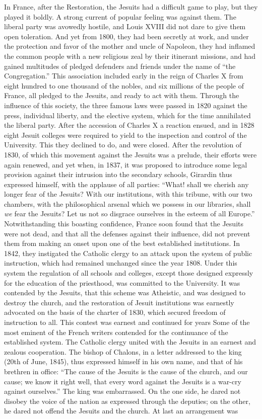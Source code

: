 \documentclass[]{book}
\begin{document}
In France, after the Restoration, the Jesuits had a difficult game to play, but they played it boldly. A strong current of popular feeling was against them. The liberal party was avowedly hostile, and Louis XVIII did not dare to give them open toleration. And yet from 1800, they had been secretly at work, and under the protection and favor of the mother and uncle of Napoleon, they had inflamed the common people with a new religious zeal by their itinerant missions, and had gained multitudes of pledged defenders and friends under the name of ``the Congregation.'' This association included early in the reign of Charles X from eight hundred to one thousand of the nobles, and six millions of the people of France, all pledged to the Jesuits, and ready to act with them. Through the influence of this society, the three famous laws were passed in 1820 against the press, individual liberty, and the elective system, which for the time annihilated the liberal party. After the accession of Charles X a reaction ensued, and in 1828 eight Jesuit colleges were required to yield to the inspection and control of the University. This they declined to do, and were closed. After the revolution of 1830, of which this movement against the Jesuits was a prelude, their efforts were again renewed, and yet when, in 1837, it was proposed to introduce some legal provision against their intrusion into the secondary schools, Girardin thus expressed himself, with the applause of all parties: ``What! shall we cherish any longer fear of the Jesuits? With our institutions, with this tribune, with our two chambers, with the philosophical arsenal which we possess in our libraries, shall \emph{we} fear the Jesuits? Let us not so disgrace ourselves in the esteem of all Europe.'' Notwithstanding this boasting confidence, France soon found that the Jesuits were not dead, and that all the defenses against their influence, did not prevent them from making an onset upon one of the best established institutions. In 1842, they instigated the Catholic clergy to an attack upon the system of public instruction, which had remained unchanged since the year 1808. Under this system the regulation of all schools and colleges, except those designed expressly for the education of the priesthood, was committed to the University. It was contended by the Jesuits, that this scheme was Atheistic, and was designed to destroy the church, and the restoration of Jesuit institutions was earnestly advocated on the basis of the charter of 1830, which secured freedom of instruction to all. This contest was earnest and continued for years Some of the most eminent of the French writers contended for the continuance of the established system. The Catholic clergy united with the Jesuits in an earnest and zealous cooperation. The bishop of Chalons, in a letter addressed to the king (20th of June, 1845), thus expressed himself in his own name, and that of his brethren in office: ``The cause of the Jesuits is the cause of the church, and our cause; we know it right well, that every word against the Jesuits is a war-cry against ourselves.'' The king was embarrassed. On the one side, he dared not disobey the voice of the nation as expressed through the deputies; on the other, he dared not offend the Jesuits and the church. At last an arrangement was 
\end{document}
